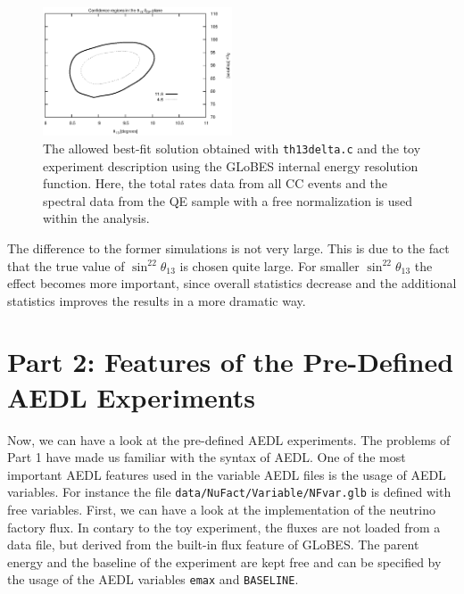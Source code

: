 \documentclass[12pt,a4paper]{article}
\theoremstyle{dotless}
\begin{document}
\begin{figure}[h!]
  \begin{center}
    \includegraphics[width=0.5\textwidth]{CCtotal.eps}   
      \end{center}
  \vspace{-0.7 cm}
  \caption{\small The allowed best-fit solution obtained with {\tt th13delta.c}
  and the toy experiment description using the GLoBES internal energy resolution function.
  Here, the total rates data from all CC events and the spectral data from the QE sample
  with a free normalization is used within the analysis.}
  \label{fig:total}
\end{figure}

The difference to the former simulations is not very large. This is due to the fact that
the true value of $\sin^22\theta_{13}$ is chosen quite large. For smaller $\sin^22\theta_{13}$
the effect becomes more important, since overall statistics decrease and the additional statistics
improves the results in a more dramatic way.

\section*{Part 2: Features of the Pre-Defined AEDL Experiments}

Now, we can have a look at the pre-defined AEDL experiments. The problems of
Part 1 have made us familiar with the syntax of AEDL. One of the most important
AEDL features used in the variable AEDL files is the usage of AEDL variables.
For instance the file {\tt data/NuFact/Variable/NFvar.glb} is defined with free
variables. First, we can have a look at the implementation of the neutrino factory
flux. In contary to the toy experiment, the fluxes are not loaded from a data file, but
derived from the built-in flux feature of GLoBES. The parent energy and the baseline of the
experiment are kept free and can be specified by the usage of the AEDL variables {\tt emax} and
{\tt BASELINE}.\\
\end{document}
